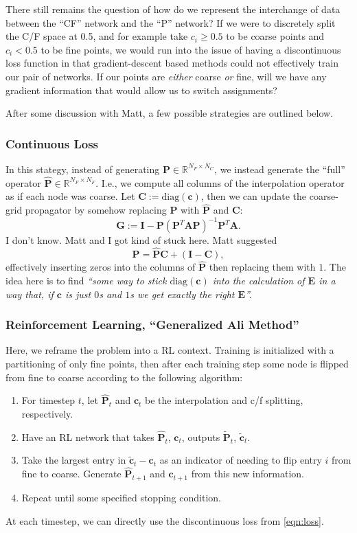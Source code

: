 \documentclass{article}
\newcommand{\mat}[1]{\bm{{#1}}}
\renewcommand{\vec}[1]{\bm{{#1}}}
\begin{document}
There still remains the question of how do we represent the interchange of data between the ``CF'' network and the ``P'' network?  If we were to discretely split the C/F space at 0.5, and for example take $c_i\geq 0.5$ to be coarse points and $c_i<0.5$ to be fine points, we would run into the issue of having a discontinuous loss function in that gradient-descent based methods could not effectively train our pair of networks.   If our points are \textit{either} coarse \textit{or} fine, will we have any gradient information that would allow us to switch assignments?

After some discussion with Matt, a few possible strategies are outlined below.
\subsubsection{Continuous Loss}
In this stategy, instead of generating $\mat{P} \in \mathbb{R}^{N_F\times N_C}$, we instead generate the ``full'' operator $\hat{\mat{P}} \in \mathbb{R}^{N_F \times N_F}$.  I.e., we compute all columns of the interpolation operator as if each node was coarse.  Let $\mat{C} := \text{diag}\left(\vec{c}\right)$, then we can update the coarse-grid propagator by somehow replacing $\mat{P}$ with $\hat{\mat{P}}$ and $\mat{C}$:
\begin{equation}
  \mat{G} := \mat{I} - \mat{P} \left( \mat{P}^T \mat{A} \mat{P} \right)^{-1} \mat{P}^T \mat{A}.
\end{equation}
I don't know.  Matt and I got kind of stuck here.  Matt suggested
\begin{equation}
  \mat{P} = \hat{\mat{P}} \mat{C} + \left(\mat{I} - \mat{C}\right),
\end{equation}
effectively inserting zeros into the columns of $\hat{\mat{P}}$ then replacing them with $1$.  The idea here is to find \textit{``some way to stick $\text{diag}\left(\vec{c}\right)$ into the calculation of $\mat{E}$ in a way that, if $\vec{c}$ is just $0$s and $1$s we get exactly the right $\mat{E}$''.}
\subsubsection{Reinforcement Learning, ``Generalized Ali Method''}
Here, we reframe the problem into a RL context.  Training is initialized with a partitioning of only fine points, then after each training step some node is flipped from fine to coarse according to the following algorithm:
\begin{enumerate}
\item For timestep $t$, let $\hat{\mat{P}}_t$ and $\mat{c}_t$ be the interpolation and c/f splitting, respectively.
\item Have an RL network that takes $\hat{\mat{P}}_t$, $\mat{c}_t$, outputs $\widetilde{\mat{P}}_t$, $\widetilde{\mat{c}}_t$.
\item Take the largest entry in $\widetilde{\vec{c}}_t - \vec{c}_t$ as an indicator of needing to flip entry $i$ from fine to coarse.  Generate $\hat{\mat{P}}_{t+1}$ and $\mat{c}_{t+1}$ from this new information.
\item Repeat until some specified stopping condition.
\end{enumerate}
At each timestep, we can directly use the discontinuous loss from \eqref{eqn:loss}.
\end{document}
